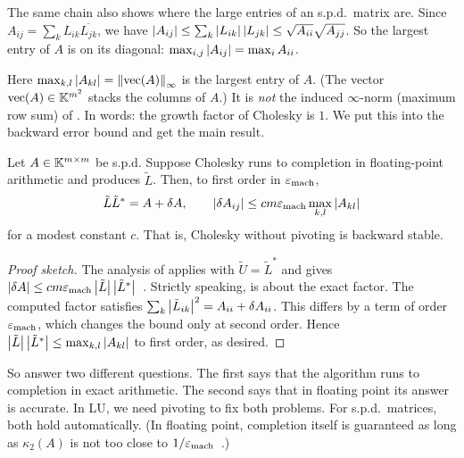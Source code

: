 The same chain also shows where the large entries of an s.p.d.\ matrix are. Since $A_{ij} = \sum_k L_{ik}\overline{L_{jk}}$, we have $\left\lvert A_{ij} \right\rvert \le \sum_k\left\lvert L_{ik} \right\rvert\left\lvert L_{jk} \right\rvert \le \sqrt{A_{ii}}\sqrt{A_{jj}}$. So the largest entry of $A$ is on its diagonal: $\max_{i,j}\left\lvert A_{ij} \right\rvert = \max_i A_{ii}$.

Here $\max_{k,l}\left\lvert A_{kl} \right\rvert = \left\lVert \operatorname{vec}(A) \right\rVert_\infty$ is the largest entry of $A$. (The vector $\operatorname{vec}(A) \in \mathbb{K}^{m^2}$ stacks the columns of $A$.) It is \emph{not} the induced $\infty$-norm (maximum row sum) of . In words: the growth factor of Cholesky is $1$. We put this into the backward error bound and get the main result.

\begin{theorem}
  \label{thm:chol-stable}
  Let $A \in \mathbb{K}^{m \times m}$ be s.p.d. Suppose Cholesky runs to completion in floating-point arithmetic and produces $\tilde{L}$. Then, to first order in $\varepsilon_{\mathrm{mach}}$,
  \begin{equation}
    \tilde{L}\tilde{L}^\ast = A + \delta A, \qquad \left\lvert \delta A_{ij} \right\rvert \le cm\varepsilon_{\mathrm{mach}}\max_{k,l}\left\lvert A_{kl} \right\rvert
  \end{equation}
  for a modest constant $c$. That is, Cholesky without pivoting is backward stable.
\end{theorem}

\begin{proof}[Proof sketch]
  The analysis of  applies with $\tilde{U} = \tilde{L}^\ast$ and gives $\left\lvert \delta A \right\rvert \le cm\varepsilon_{\mathrm{mach}}\left\lvert \tilde{L} \right\rvert\left\lvert \tilde{L}^\ast \right\rvert$~\cite[Theorem 10.3]{Higham}. Strictly speaking,  is about the exact factor. The computed factor satisfies $\sum_k\left\lvert \tilde{L}_{ik} \right\rvert^2 = A_{ii} + \delta A_{ii}$. This differs by a term of order $\varepsilon_{\mathrm{mach}}$, which changes the bound only at second order. Hence $\left\lvert \tilde{L} \right\rvert\left\lvert \tilde{L}^\ast \right\rvert \le \max_{k,l}\left\lvert A_{kl} \right\rvert$ to first order, as desired.
\end{proof}

So  answer two different questions. The first says that the algorithm runs to completion in exact arithmetic. The second says that in floating point its answer is accurate. In LU, we need pivoting to fix both problems. For s.p.d.\ matrices, both hold automatically. (In floating point, completion itself is guaranteed as long as $\kappa_2(A)$ is not too close to $1/\varepsilon_{\mathrm{mach}}$~\cite[Theorem 10.7]{Higham}.)

